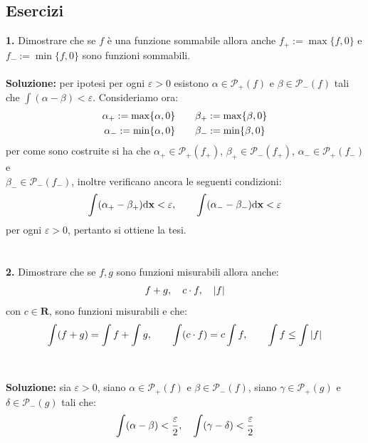 \documentclass{article}
\begin{document}
\subsection{Esercizi}
\textbf{1.} Dimostrare che se $f$ è una funzione sommabile allora anche $f_+ := \max \{ f, 0 \}$ e $f_- := \min \{ f, 0 \}$ sono funzioni sommabili. \\ \\
\textbf{Soluzione:} per ipotesi per ogni $\varepsilon > 0$ esistono $\alpha \in \mathcal{P}_+(f)$ e $\beta \in \mathcal{P}_-(f)$ tali che $\int (\alpha - \beta) < \varepsilon$. Consideriamo ora:
\begin{gather}
    \alpha_+ := \max \{ \alpha, 0 \} \qquad \beta_+ := \max \{ \beta, 0 \} \notag \\
    \alpha_- := \min \{ \alpha, 0 \} \qquad \beta_- := \min \{ \beta, 0 \} \notag
\end{gather}
per come sono costruite si ha che $\alpha_+ \in \mathcal{P}_+(f_+)$, $\beta_+ \in \mathcal{P}_-(f_+)$, $\alpha_- \in \mathcal{P}_+(f_-)$ e \\ $\beta_- \in \mathcal{P}_-(f_-)$, inoltre verificano ancora le seguenti condizioni:
\begin{gather}
    \int (\alpha_+ - \beta_+) \mathrm{d}\mathbf{x} < \varepsilon, \qquad \int (\alpha_- - \beta_-) \mathrm{d}\mathbf{x} < \varepsilon \notag
\end{gather}
per ogni $\varepsilon > 0$, pertanto si ottiene la tesi. \\ \\ \\
\textbf{2.} Dimostrare che se $f, g$ sono funzioni misurabili allora anche:
\begin{gather}
    f + g, \quad c \cdot f, \quad | f | \notag
\end{gather}
con $c \in \mathbf{R}$, sono funzioni misurabili e che:
\begin{gather}
    \int (f + g) = \int f + \int g, \qquad \int (c \cdot f) = c \int f, \qquad \int f \leq \int |f| \notag
\end{gather}\\ \\
\textbf{Soluzione:} sia $\varepsilon > 0$, siano $\alpha \in \mathcal{P}_+(f)$ e $\beta \in \mathcal{P}_-(f)$, siano $\gamma \in \mathcal{P}_+(g)$ e $\delta \in \mathcal{P}_-(g)$ tali che:
\begin{gather}
    \int (\alpha - \beta) < \frac{\varepsilon}{2}, \quad \int (\gamma - \delta) < \frac{\varepsilon}{2} \notag
\end{gather}
\end{document}
